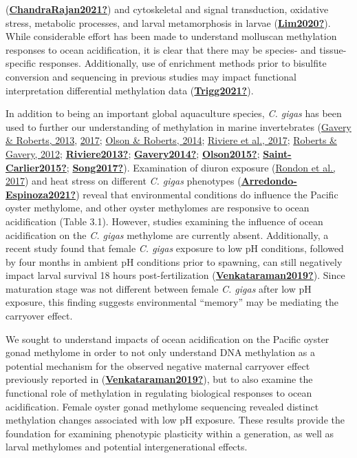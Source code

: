 \documentclass [11pt, proquest] {uwthesis}[2015/03/03]
\begin{document}
(\protect\hyperlink{ref-ChandraRajan2021}{\textbf{ChandraRajan2021?}}) and cytoskeletal and signal transduction, oxidative stress, metabolic processes, and larval metamorphosis in larvae (\protect\hyperlink{ref-Lim2020}{\textbf{Lim2020?}}). While considerable effort has been made to understand molluscan methylation responses to ocean acidification, it is clear that there may be species- and tissue-specific responses. Additionally, use of enrichment methods prior to bisulfite conversion and sequencing in previous studies may impact functional interpretation differential methylation data (\protect\hyperlink{ref-Trigg2021}{\textbf{Trigg2021?}}).

In addition to being an important global aquaculture species, \emph{C. gigas} has been used to further our understanding of methylation in marine invertebrates (\protect\hyperlink{ref-Gavery2013}{Gavery \& Roberts, 2013}, \protect\hyperlink{ref-Gavery2017}{2017}; \protect\hyperlink{ref-Olson2014}{Olson \& Roberts, 2014}; \protect\hyperlink{ref-Riviere2017}{Riviere et al., 2017}; \protect\hyperlink{ref-Roberts2012}{Roberts \& Gavery, 2012}; \protect\hyperlink{ref-Riviere2013}{\textbf{Riviere2013?}}; \protect\hyperlink{ref-Gavery2014}{\textbf{Gavery2014?}}; \protect\hyperlink{ref-Olson2015}{\textbf{Olson2015?}}; \protect\hyperlink{ref-Saint-Carlier2015}{\textbf{Saint-Carlier2015?}}; \protect\hyperlink{ref-Song2017}{\textbf{Song2017?}}). Examination of diuron exposure (\protect\hyperlink{ref-Rondon2017}{Rondon et al., 2017}) and heat stress on different \emph{C. gigas} phenotypes (\protect\hyperlink{ref-Arredondo-Espinoza2021}{\textbf{Arredondo-Espinoza2021?}}) reveal that environmental conditions do influence the Pacific oyster methylome, and other oyster methylomes are responsive to ocean acidification (Table 3.1). However, studies examining the influence of ocean acidification on the \emph{C. gigas} methylome are currently absent. Additionally, a recent study found that female \emph{C. gigas} exposure to low pH conditions, followed by four months in ambient pH conditions prior to spawning, can still negatively impact larval survival 18 hours post-fertilization (\protect\hyperlink{ref-Venkataraman2019}{\textbf{Venkataraman2019?}}). Since maturation stage was not different between female \emph{C. gigas} after low pH exposure, this finding suggests environmental ``memory'' may be mediating the carryover effect.

We sought to understand impacts of ocean acidification on the Pacific oyster gonad methylome in order to not only understand DNA methylation as a potential mechanism for the observed negative maternal carryover effect previously reported in (\protect\hyperlink{ref-Venkataraman2019}{\textbf{Venkataraman2019?}}), but to also examine the functional role of methylation in regulating biological responses to ocean acidification. Female oyster gonad methylome sequencing revealed distinct methylation changes associated with low pH exposure. These results provide the foundation for examining phenotypic plasticity within a generation, as well as larval methylomes and potential intergenerational effects.
\end{document}
